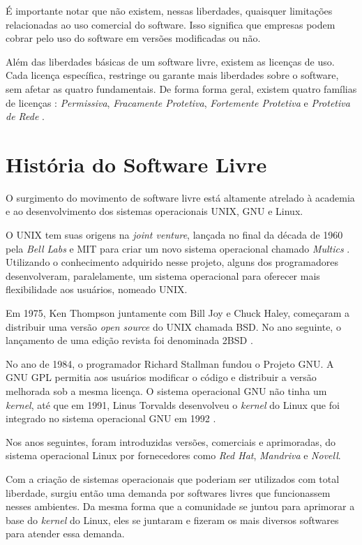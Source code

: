 É importante notar que não existem, nessas liberdades, quaisquer limitações relacionadas ao uso comercial do software. Isso significa que empresas podem cobrar pelo uso do software em versões modificadas ou não.

Além das liberdades básicas de um software livre, existem as licenças de uso. Cada licença específica, restringe ou garante mais liberdades sobre o software, sem afetar as quatro fundamentais. De forma forma geral, existem quatro famílias de licenças : \textit{Permissiva},  \textit{Fracamente Protetiva},  \textit{Fortemente Protetiva} e \textit{Protetiva de Rede} \cite{Williams}. 

\section{História do Software Livre}
O surgimento do movimento de software livre está altamente atrelado à academia e ao desenvolvimento dos sistemas operacionais UNIX, GNU e Linux.

O UNIX tem suas origens na \textit{joint venture}, lançada no final da década de 1960 pela \textit{Bell Labs} e MIT para criar um novo sistema operacional chamado \textit{Multics} \cite{tozzi2017fun}. Utilizando o conhecimento adquirido nesse projeto, alguns dos programadores desenvolveram, paralelamente, um sistema operacional para oferecer mais flexibilidade aos usuários, nomeado UNIX. 

Em 1975, Ken Thompson juntamente com Bill Joy e Chuck Haley, começaram a distribuir uma versão \textit{open source} do UNIX chamada BSD. No ano seguinte, o lançamento de uma edição revista foi denominada 2BSD \cite{tozzi2017fun}.

No ano de 1984, o programador Richard Stallman fundou o Projeto GNU. A GNU GPL permitia aos usuários modificar o código e distribuir a versão melhorada sob a mesma licença. O sistema operacional GNU não tinha um \textit{kernel}, até que em 1991, Linus Torvalds desenvolveu o \textit{kernel} do Linux que foi integrado no sistema operacional GNU em 1992 \cite{tozzi2017fun}.

Nos anos seguintes, foram introduzidas versões, comerciais e aprimoradas, do sistema operacional Linux por fornecedores como \textit{Red Hat}, \textit{Mandriva} e \textit{Novell}.

Com a criação de sistemas operacionais que poderiam ser utilizados com total liberdade, surgiu então uma demanda por softwares livres que funcionassem nesses ambientes. Da mesma forma que a comunidade se juntou para aprimorar a base do \textit{kernel} do Linux, eles se juntaram e fizeram os mais diversos softwares para atender essa demanda. 

